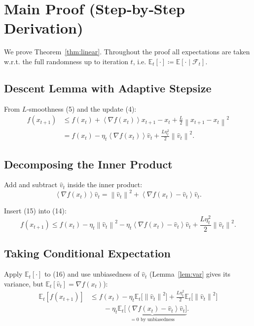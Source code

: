 \documentclass{article}
\newcommand{\E}{\mathbb{E}}
\newcommand{\norm}[1]{\left\|#1\right\|}
\newcommand{\inner}[1]{\left\langle#1\right\rangle}
\begin{document}
\section*{Main Proof (Step‑by‑Step Derivation)}
We prove Theorem~\ref{thm:linear}. Throughout the proof all expectations are taken w.r.t. the full randomness up to iteration $t$, i.e. $\E_{t}[\cdot]\coloneqq \E[\cdot\mid\mathcal{F}_{t}]$.

\subsection*{Descent Lemma with Adaptive Stepsize}
From $L$‑smoothness (5) and the update (4):
\[
\begin{aligned}
f(x_{t+1})
&\le f(x_{t})+\inner{\nabla f(x_{t})}{x_{t+1}-x_{t}}+\frac{L}{2}\norm{x_{t+1}-x_{t}}^{2}\\
&= f(x_{t})-\eta_{t}\inner{\nabla f(x_{t})}{\hat v_{t}}+\frac{L\eta_{t}^{2}}{2}\norm{\hat v_{t}}^{2}.
\tag{14}
\end{aligned}
\]

\subsection*{Decomposing the Inner Product}
Add and subtract $\hat v_{t}$ inside the inner product:
\[
\inner{\nabla f(x_{t})}{\hat v_{t}}
= \norm{\hat v_{t}}^{2}
+ \inner{\nabla f(x_{t})-\hat v_{t}}{\hat v_{t}}.
\tag{15}
\]

Insert (15) into (14):
\[
f(x_{t+1})\le f(x_{t})-\eta_{t}\norm{\hat v_{t}}^{2}
-\eta_{t}\inner{\nabla f(x_{t})-\hat v_{t}}{\hat v_{t}}
+\frac{L\eta_{t}^{2}}{2}\norm{\hat v_{t}}^{2}.
\tag{16}
\]

\subsection*{Taking Conditional Expectation}
Apply $\E_{t}[\cdot]$ to (16) and use unbiasedness of $\hat v_{t}$ (Lemma~\ref{lem:var} gives its variance, but $\E_{t}[\hat v_{t}]=\nabla f(x_{t})$):
\[
\begin{aligned}
\E_{t}[f(x_{t+1})]
&\le f(x_{t})-\eta_{t}\E_{t}\!\bigl[\norm{\hat v_{t}}^{2}\bigr]
+\frac{L\eta_{t}^{2}}{2}\E_{t}\!\bigl[\norm{\hat v_{t}}^{2}\bigr]\\
&\qquad -\eta_{t}\underbrace{\E_{t}\!\bigl[\inner{\nabla f(x_{t})-\hat v_{t}}{\hat v_{t}}\bigr]}_{=0\text{ by unbiasedness}}.
\end{aligned}
\tag{17}
\]
\end{document}

